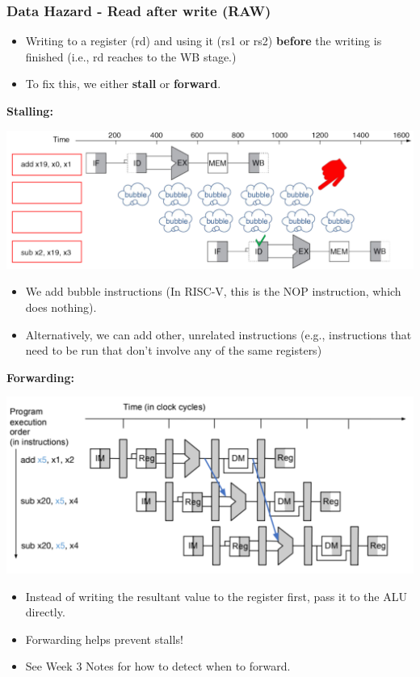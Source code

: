 \documentclass[10pt]{article}
\begin{document}
\subsubsection*{Data Hazard - Read after write (RAW)}
\begin{itemize}
    \item Writing to a register (rd) and using it (rs1 or rs2) \textbf{before} the writing is finished (i.e., rd reaches to the WB stage.)
    \item To fix this, we either \textbf{stall} or \textbf{forward}.
\end{itemize}
\textbf{Stalling:}
\begin{center}
    \includegraphics*[scale=0.8]{W3_9.png}
\end{center}
\begin{itemize}
    \item We add bubble instructions (In RISC-V, this is the NOP instruction, which does nothing).
    \item Alternatively, we can add other, unrelated instructions (e.g., instructions that need to be run that don't involve any of the same registers)
\end{itemize}
\textbf{Forwarding:}
\begin{center}
    \includegraphics*[scale=0.8]{W3_11.png}
\end{center}
\begin{itemize}
    \item Instead of writing the resultant value to the register first, pass it to the ALU directly.
    \item Forwarding helps prevent stalls!
    \item See Week 3 Notes for how to detect when to forward.
\end{itemize}
\end{document}
